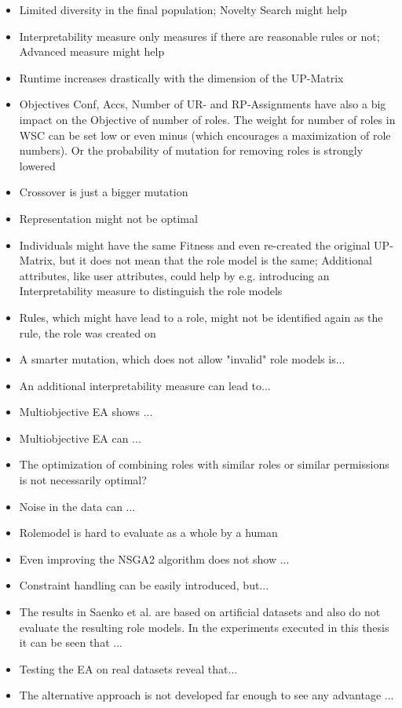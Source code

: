 \begin{itemize}
    \item Limited diversity in the final population; Novelty Search might help
    \item Interpretability measure only measures if there are reasonable rules or not; Advanced measure might help
    \item Runtime increases drastically with the dimension of the UP-Matrix
    \item Objectives Conf, Accs, Number of UR- and RP-Assignments have also a big impact on the Objective of number of roles. The weight for number of roles in WSC can be set low or even minus (which encourages a maximization of role numbers). Or the probability of mutation for removing roles is strongly lowered
    \item Crossover is just a bigger mutation
    \item Representation might not be optimal
    \item Individuals might have the same Fitness and even re-created the original UP-Matrix, but it does not mean that the role model is the same; Additional attributes, like user attributes, could help by e.g. introducing an Interpretability measure to distinguish the role models
    \item Rules, which might have lead to a role, might not be identified again as the rule, the role was created on
    \item A smarter mutation, which does not allow "invalid" role models is...
    \item An additional interpretability measure can lead to...
    \item Multiobjective EA shows ...
    \item Multiobjective EA can ...
    \item The optimization of combining roles with similar roles or similar permissions is not necessarily optimal?
    \item Noise in the data can ...
    \item Rolemodel is hard to evaluate as a whole by a human
    \item Even improving the NSGA2 algorithm does not show ...
    \item Constraint handling can be easily introduced, but...
    \item The results in Saenko et al. are based on artificial datasets and also do not evaluate the resulting role models. In the experiments executed in this thesis it can be seen that ...
    \item Testing the EA on real datasets reveal that...
    \item The alternative approach is not developed far enough to see any advantage ...
\end{itemize}

